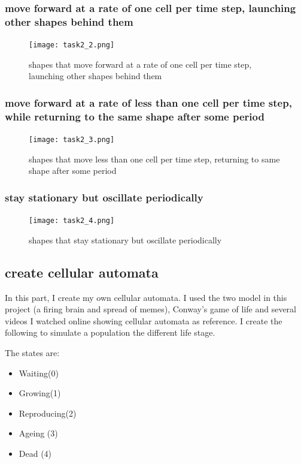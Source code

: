 \documentclass[12pt]{article}
\begin{document}
{\subsubsection{move forward at a rate of one cell per time step, launching other shapes behind them}
\begin{figure}[H] %
\centering
\texttt{[image: task2\_2.png]}
\caption{shapes that move forward at a rate of one cell per time step, launching other shapes behind them}
\label{fig:task2_2}
\end{figure}

\subsubsection{move forward at a rate of less than one cell per time step, while returning to the same shape after some period}
\begin{figure}[H] %
\centering
\texttt{[image: task2\_3.png]}
\caption{shapes that move less than one cell per time step, returning to same shape after some period}
\label{fig:task2_3}
\end{figure}

\subsubsection{stay stationary but oscillate periodically}
\begin{figure}[H] %
\centering
\texttt{[image: task2\_4.png]}
\caption{shapes that stay stationary but oscillate periodically}
\label{fig:task2_4}
\end{figure}


\subsection{create cellular automata}
In this part, I create my own cellular automata. I used the two model in this project (a firing brain and spread of memes), Conway's game of life and several videos I watched online showing cellular automata as reference. I create the following to simulate a population the different life stage.\par
The states are:
\begin{itemize}  
\item Waiting(0)
\item Growing(1)
\item Reproducing(2)
\item Ageing (3)
\item Dead (4)\\
\end{itemize}

}
\end{document}
